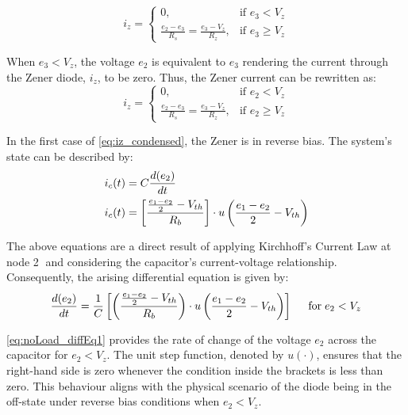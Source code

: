 \begin{equation}
	i_z = \begin{cases}
		0, & \text{if } e_3 < V_z \\
		\frac{e_2 - e_3}{R_s}=\frac{e_3 - V_z}{R_z}, & \text{if } e_3 \geq V_z
	\end{cases}
    \label{eq:iz_reverse_bias}
\end{equation}

When $e_3 < V_z$, the voltage $e_2$ is equivalent to $e_3$ rendering the current through the Zener diode, $i_z$, to be zero. Thus, the Zener current can be rewritten as:
\begin{equation}
    i_z=\begin{cases}
        0,  & \text{if } e_2 < V_z \\
        \frac{e_2-e_3}{R_s}=\frac{e_3-V_z}{R_z}, & \text{if } e_2 \geq V_z
    \end{cases}
    \label{eq:iz_condensed}
\end{equation}

In the first case of \eqref{eq:iz_condensed}, the Zener is in reverse bias. The system's state can be described by:
\begin{equation}
    \begin{split}
        i_c(t) &= C\frac{d(e_2)}{dt} \\
        i_c(t) &= \left[\frac{\frac{e_1 - e_2}{2} - V_{th}}{R_b} \right]\cdot u\left(\frac{e_1 - e_2}{2} - V_{th} \right)
    \end{split}
    \label{eq:ic_reverse_bias}
\end{equation}

\pagebreak
The above equations are a direct result of applying Kirchhoff's Current Law at node \textcircled{2} and considering the capacitor's current-voltage relationship. Consequently, the arising differential equation is given by:
\begin{equation}
     \frac{d(e_2)}{dt}=\frac{1}{C} \left[\left(\frac{\frac{e_1 - e_2}{2} - V_{th}}{R_b} \right) \cdot u\left(\frac{e_1-e_2}{2}-V_{th} \right) \right] \hspace{0.5cm} \text{for} \hspace{0.1cm} e_2 < V_z
    \label{eq:noLoad_diffEq1}
\end{equation}

\eqref{eq:noLoad_diffEq1} provides the rate of change of the voltage $e_2$ across the capacitor for $e_2 < V_z$. The unit step function, denoted by $u(\cdot)$, ensures that the right-hand side is zero whenever the condition inside the brackets is less than zero. This behaviour aligns with the physical scenario of the diode being in the off-state under reverse bias conditions when $e_2 < V_z$.

